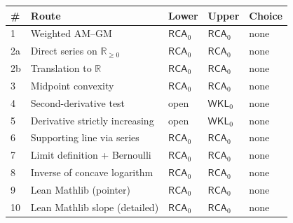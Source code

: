 \documentclass[11pt,reqno]{amsart}
\providecommand{\R}{\mathbb{R}}
\theoremstyle{redplain}
\numberwithin{equation}{section}
\begin{document}
\begin{center}
{\small 
\begin{tabular}{|m{0.6cm}|m{5cm}|m{1.4cm}|m{1.4cm}|m{1.4cm}|}
\hline
\textbf{\#} & \textbf{Route} & \textbf{Lower} & \textbf{Upper} & \textbf{%
Choice} \\ \hline
1 & Weighted AM--GM & $\mathsf{RCA}_{0}$ & $\mathsf{RCA}_{0}$ & none \\ 
\hline
2a & Direct series on $\R_{\geq 0}$ & $\mathsf{RCA}_{0}$ & $\mathsf{RCA}_{0}$
& none \\ \hline
2b & Translation to $\R$ & $\mathsf{RCA}_{0}$ & $\mathsf{RCA}_{0}$ & none \\ 
\hline
3 & Midpoint convexity & $\mathsf{RCA}_{0}$ & $\mathsf{RCA}_{0}$ & none \\ 
\hline
4 & Second-derivative test & open & $\mathsf{WKL}_{0}$ & none \\ \hline
5 & Derivative strictly increasing & open & $\mathsf{WKL}_{0}$ & none \\ 
\hline
6 & Supporting line via series & $\mathsf{RCA}_{0}$ & $\mathsf{RCA}_{0}$ & 
none \\ \hline
7 & Limit definition + Bernoulli & $\mathsf{RCA}_{0}$ & $\mathsf{RCA}_{0}$ & 
none \\ \hline
8 & Inverse of concave logarithm & $\mathsf{RCA}_{0}$ & $\mathsf{RCA}_{0}$ & 
none \\ \hline
9 & Lean Mathlib (pointer) & $\mathsf{RCA}_{0}$ & $\mathsf{RCA}_{0}$ & none
\\ \hline
10 & Lean Mathlib slope (detailed) & $\mathsf{RCA}_{0}$ & $\mathsf{RCA}_{0}$
& none \\ \hline
\end{tabular}
}


\end{center}
\end{document}
